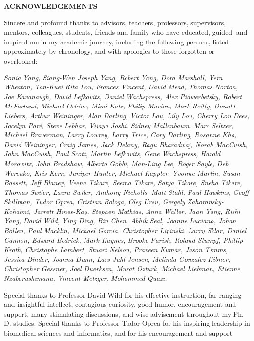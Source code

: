 \begin{centering}
\textbf{ACKNOWLEDGEMENTS}\\
\vspace{\baselineskip}
\end{centering}

Sincere and profound thanks to advisors, teachers, professors, supervisors, mentors, colleagues, students, friends and family who have educated, guided, and inspired me in my academic journey, including the following persons, listed approximately by chronology, and with apologies to those forgotten or overlooked:

\begin{singlespace}
\textit{Sonia Yang, Siang-Wen Joseph Yang, Robert Yang, Dora Marshall,
Vera Wheaton, Tan-Kuei Rita Lou, Frances Vincent, David Mead, Thomas
Norton, Joe Kavanaugh, David Lefkovits, Daniel Wachspress, Alex
Pidwerbetsky, Robert McFarland, Michael Oshins, Mimi Katz, Philip
Marion, Mark Reilly, Donald Liebers, Arthur Weininger, Alan Darling,
Victor Lou, Lily Lou, Cherry Lou Dees, Jocelyn Par\'e, Steve Lebhar,
Vijaya Joshi, Sidney Mallenbaum, Marc Seltzer, Michael Braverman, Larry
Lowrey, Larry Trice, Cary Darling, Rosanne Kho, David Weininger, Craig
James, Jack Delany, Ragu Bharadwaj, Norah MacCuish, John MacCuish, Paul
Scott, Martin Lefkovits, Gene Wachspress, Harold Morowitz, John
Bradshaw, Alberto Gobbi, Man-Ling Lee, Roger Sayle, Deb Werenko, Kris
Kern, Juniper Hunter, Michael Kappler, Yvonne Martin, Susan Bassett,
Jeff Blaney, Veena Tikare, Seema Tikare, Satya Tikare, Sneha Tikare,
Thomas Swiler, Laura Swiler, Anthony Nicholls, Matt Stahl, Paul
Hawkins, Geoff Skillman, Tudor Oprea, Cristian Bologa, Oleg Ursu,
Gergely Zahoransky-Kohalmi, Jarrett Hines-Kay, Stephen Mathias, Anna
Waller, Jaan Yang, Rishi Yang, David Wild, Ying Ding, Bin Chen, Abhik
Seal, Joanne Luciano, Johan Bollen, Paul Macklin, Michael Garcia,
Christopher Lipinski, Larry Sklar, Daniel Cannon, Edward Bedrick,
Mark Haynes, Brooke Parish, Roland Stumpf, Phillip Kroth, Christophe Lambert,
Stuart Nelson, Praveen Kumar, Jason Timms, Jessica Binder, Joanna Dunn, 
Lars Juhl Jensen, Melinda Gonzalez-Hibner, Christopher Gessner, Joel Duerksen,
Murat Ozturk, Michael Liebman, Etienne Nzabarushimana, Vincent Metzger, 
Mohammed Quazi.}
\end{singlespace}

Special thanks to Professor David Wild for his effective instruction, far ranging and insightful intellect, contagious curiosity, good humor, encouragement and support, many stimulating discussions, and wise advisement throughout my Ph. D. studies. Special thanks to Professor Tudor Oprea for his inspiring leadership in biomedical sciences and informatics, and for his encouragement and support. 
